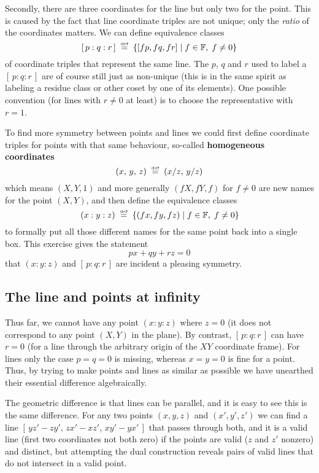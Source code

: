 \documentclass[12pt]{article}
\def\comma{,\,\allowbreak}
\def\Fset{\mathbb{F}}
\def\isdef{\mathrel{\mathop{=}\limits^{\smash{\hbox{\tiny def}}}}}
\begin{document}
Secondly, there are three coordinates for the line but only two for the point.
This is caused by the fact that line coordinate triples are not unique; only
the {\em ratio\/} of the coordinates matters. We can define equivalence classes
$$
  [\,p : q : r\,] \;\isdef\; \{ [fp,fq,fr] \mid f\in\Fset,\; f\ne0 \}
$$
of coordinate triples that represent the same line. The $p$, $q$ and $r$ used
to label a $[\,p : q : r\,]$ are of course still just as non-unique (this
is in the same spirit as labeling a residue class or other coset by one of
its elements). One possible convention (for lines with $r\ne0$ at least)
is to choose the representative with $r=1$.

To find more symmetry between points and lines we could first define coordinate
triples for points with that same behaviour, so-called {\bf homogeneous coordinates}
$$
  (x\comma y\comma z) \;\isdef\; (x/z\comma y/z)
$$
which means $(X,Y,1)$ and more generally $(fX,fY,f)$ for $f\ne0$ are new
names for the point $(X,Y)$, and then define the equivalence classes
$$
  (x : y : z) \;\isdef\; \{ (fx,fy,fz) \mid f\in\Fset,\; f\ne0 \}
$$
to formally put all those different names for the same point back into a
single box. This exercise gives the statement
\begin{equation}\label{px+qy+rz}
  px + qy + rz = 0
\end{equation}
that $(x:y:z)$ and $[\,p:q:r\,]$ are incident a pleasing symmetry.

\clearpage
\subsection*{The line and points at infinity}

Thus far, we cannot have any point $(x:y:z)$ where $z=0$ (it does not
correspond to any point $(X,Y)$ in the plane). By contrast, $[\,p:q:r\,]$
can have $r=0$ (for a line through the arbitrary origin of the $XY$ coordinate
frame). For lines only the case $p=q=0$ is missing, whereas $x=y=0$ is
fine for a point. Thus, by trying to make points and lines as similar as
possible we have unearthed their essential difference algebraically.

The geometric difference is that lines can be parallel, and it is easy to
see this is the same difference. For any two points $(x,y,z)$ and
$(x',y',z')$ we can find a line $[\,yz'-zy'\comma zx'-xz'\comma xy'-yx'\,]$
that passes through both, and it is a valid line (first two coordinates not
both zero) if the points are valid ($z$ and $z'$ nonzero) and distinct,
but attempting the dual construction reveals pairs of valid lines that do
not intersect in a valid point.
\end{document}
